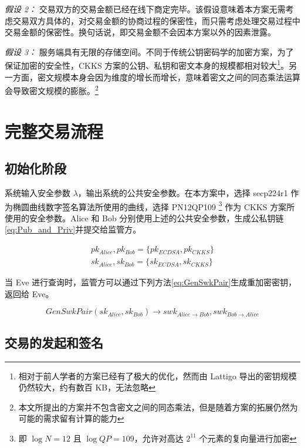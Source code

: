 \textit{假设 2：} 交易双方的交易金额已经在线下商定完毕。该假设意味着本方案无需考虑交易双方具体的，对交易金额的协商过程的保密性，而只需考虑处理交易过程中交易金额的保密性。换句话说，即交易金额不会因本方案以外的因素泄露。

\textit{假设 3：} 服务端具有无限的存储空间。不同于传统公钥密码学的加密方案，为了保证加密的安全性，CKKS 方案的公钥、私钥和密文本身的规模都相对较大\footnote{相对于前人学者的方案已经有了极大的优化，然而由 Lattigo 导出的密钥规模仍然较大，约有数百 KB，无法忽略}。另一方面，密文规模本身会因为维度的增长而增长，意味着密文之间的同态乘法运算会导致密文规模的膨胀。\footnote{本文所提出的方案并不包含密文之间的同态乘法，但是随着方案的拓展仍然为可能的需求留有计算的能力}

\section{完整交易流程}

\subsection{初始化阶段}

系统输入安全参数 $\lambda$，输出系统的公共安全参数。在本方案中，选择 secp224r1 作为椭圆曲线数字签名算法所使用的曲线，选择 PN12QP109 \footnote{即 $\log N = 12$ 且 $\log QP = 109$，允许对高达 $2^{11}$ 个元素的复向量进行加密} 作为 CKKS 方案所使用的安全参数。Alice 和 Bob 分别使用上述的公共安全参数，生成公私钥链\eqref{eq:Pub_and_Priv}并提交给监管方。

\begin{equation} \label{eq:Pub_and_Priv}
\begin{aligned}
    pk_{Alice}, pk_{Bob} = \{pk_{ECDSA}, pk_{CKKS}\}\\
    sk_{Alice}, sk_{Bob} = \{sk_{ECDSA}, sk_{CKKS}\}
\end{aligned}
\end{equation}

当 Eve 进行查询时，监管方可以通过下列方法\eqref{eq:GenSwkPair}生成重加密密钥，返回给 Eve。

\begin{equation} \label{eq:GenSwkPair}
    GenSwkPair(sk_{Alice}, sk_{Bob}) \rightarrow swk_{Alice \rightarrow Bob},
    swk_{Bob \rightarrow Alice}
\end{equation}

\subsection{交易的发起和签名}

